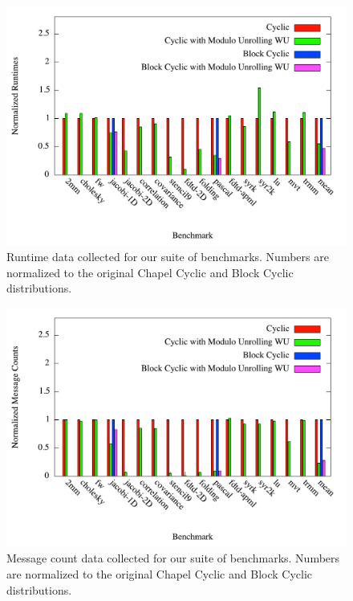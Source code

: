 \begin{figure}
\begin{center}
\includegraphics[scale=0.29]{./Figures/runtimes}
\caption{Runtime data collected for our suite of benchmarks. Numbers are normalized to the original Chapel Cyclic and Block Cyclic distributions. }
\label{runtimes}
\end{center}
\end{figure}

\begin{figure}
\begin{center}
\includegraphics[scale=0.29]{./Figures/message_counts}
\caption{Message count data collected for our suite of benchmarks. Numbers are normalized to the original Chapel Cyclic and Block Cyclic distributions. }
\label{message_counts}
\end{center}
\end{figure}

